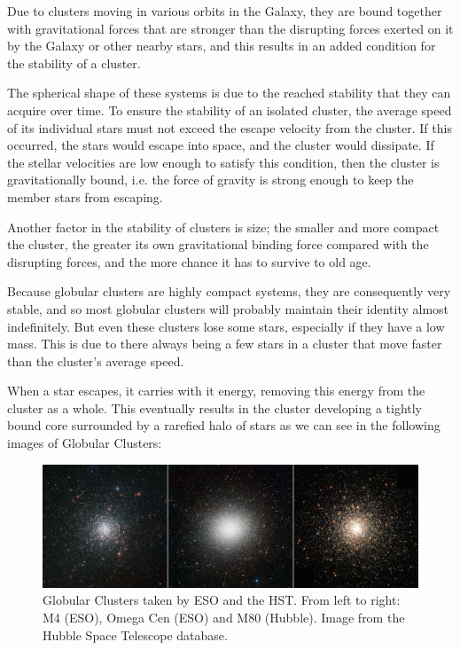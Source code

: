 Due to clusters moving in various orbits in the Galaxy, they are bound together with gravitational forces that are stronger than the disrupting forces exerted on it by the Galaxy or other nearby stars, and this results in an added condition for the stability of a cluster.

The spherical shape of these systems is due to the reached stability that they can acquire over time. To ensure the stability of an isolated cluster, the average speed of its individual stars must not exceed the escape velocity from the cluster. If this occurred, the stars would escape into space, and the cluster would dissipate. If the stellar velocities are low enough to satisfy this condition, then the cluster is gravitationally bound, i.e. the force of gravity is strong enough to keep the member stars from escaping.

Another factor in the stability of clusters is size; the smaller and more compact the cluster, the greater its own gravitational binding force compared with the disrupting forces, and the more chance it has to survive to old age.

Because globular clusters are highly compact systems, they are consequently very stable, and so most globular clusters will probably maintain their identity almost indefinitely. But even these clusters lose some stars, especially if they have a low mass. This is due to there always being a few stars in a cluster that move faster than the cluster's average speed.

When a star escapes, it carries with it energy, removing this energy from the cluster as a whole. This eventually results in the cluster developing a tightly bound core surrounded by a rarefied halo of stars as we can see in the following images of Globular Clusters:

\begin{figure}[H]
\centering
\includegraphics[width=14.5cm]{images/3_gcs.png}
\caption[ESO and Hubble images of Globular Clusters]{Globular Clusters taken by ESO and the HST. From left to right: M4 (ESO), Omega Cen (ESO) and M80 (Hubble). Image from the Hubble Space Telescope database.}
\end{figure}

